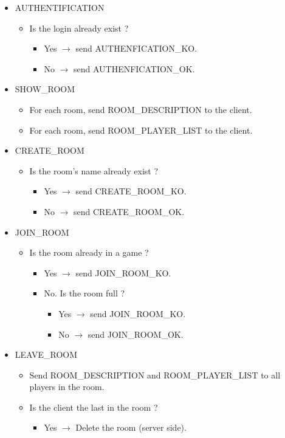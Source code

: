 \documentclass[a4 paper, 12pt]{report}
\begin{document}
\begin{itemize}

\item AUTHENTIFICATION
  \begin{itemize}
  \item Is the login already exist ?
    \begin{itemize}
    \item Yes $\rightarrow$ send AUTHENFICATION\_KO.
    \item No $\rightarrow$ send AUTHENFICATION\_OK.
    \end{itemize}
  \end{itemize}

\item SHOW\_ROOM
  \begin{itemize}
  \item For each room, send ROOM\_DESCRIPTION to the client.
  \item For each room, send ROOM\_PLAYER\_LIST to the client.
  \end{itemize}

\item CREATE\_ROOM
  \begin{itemize}
  \item Is the room's name already exist ?
    \begin{itemize}
    \item Yes $\rightarrow$ send CREATE\_ROOM\_KO.
    \item No $\rightarrow$ send CREATE\_ROOM\_OK.
    \end{itemize}
  \end{itemize}

\item JOIN\_ROOM
  \begin{itemize}
  \item Is the room already in a game ?
    \begin{itemize}
    \item Yes $\rightarrow$ send JOIN\_ROOM\_KO.
    \item No. Is the room full ?
      \begin{itemize}
      \item Yes $\rightarrow$ send JOIN\_ROOM\_KO.
      \item No $\rightarrow$ send JOIN\_ROOM\_OK.
      \end{itemize}
    \end{itemize}
  \end{itemize}

\item LEAVE\_ROOM
  \begin{itemize}
    \item Send ROOM\_DESCRIPTION and ROOM\_PLAYER\_LIST to all players in the room.
    \item Is the client the last in the room ?
      \begin{itemize}
        \item Yes $\rightarrow$ Delete the room (server side).
      \end{itemize}
  \end{itemize}


\end{itemize}
\end{document}
